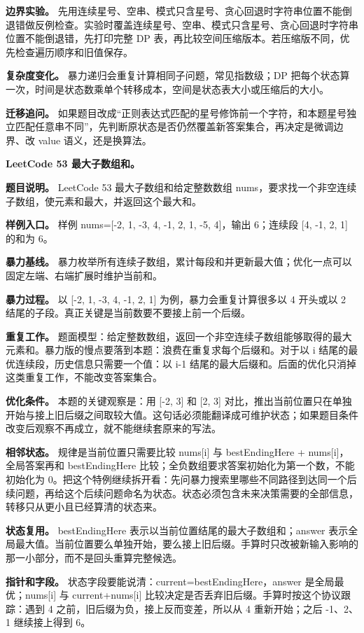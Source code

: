 \textbf{边界实验。} 先用连续星号、空串、模式只含星号、贪心回退时字符串位置不能倒退错做反例检查。实验时覆盖连续星号、空串、模式只含星号、贪心回退时字符串位置不能倒退错，先打印完整 DP 表，再比较空间压缩版本。若压缩版不同，优先检查遍历顺序和旧值保存。

\textbf{复杂度变化。} 暴力递归会重复计算相同子问题，常见指数级；DP 把每个状态算一次，时间是状态数乘单个转移成本，空间是状态表大小或压缩后的大小。

\textbf{迁移追问。} 如果题目改成“正则表达式匹配的星号修饰前一个字符，和本题星号独立匹配任意串不同”，先判断原状态是否仍然覆盖新答案集合，再决定是微调边界、改 value 语义，还是换算法。

\noindent\textbf{LeetCode 53 最大子数组和。}

\textbf{题目说明。} LeetCode 53 最大子数组和给定整数数组 nums，要求找一个非空连续子数组，使元素和最大，并返回这个最大和。

\textbf{样例入口。} 样例 nums=[-2, 1, -3, 4, -1, 2, 1, -5, 4]，输出 6；连续段 [4, -1, 2, 1] 的和为 6。

\textbf{暴力基线。} 暴力枚举所有连续子数组，累计每段和并更新最大值；优化一点可以固定左端、右端扩展时维护当前和。

\textbf{暴力过程。} 以 [-2, 1, -3, 4, -1, 2, 1] 为例，暴力会重复计算很多以 4 开头或以 2 结尾的子段。真正关键是当前数要不要接上前一个后缀。

\textbf{重复工作。} 题面模型：给定整数数组，返回一个非空连续子数组能够取得的最大元素和。暴力版的慢点要落到本题：浪费在重复求每个后缀和。对于以 i 结尾的最优连续段，历史信息只需要一个值：以 i-1 结尾的最大后缀和。后面的优化只消掉这类重复工作，不能改变答案集合。

\textbf{优化条件。} 本题的关键观察是：用 [-2, 3] 和 [2, 3] 对比，推出当前位置只在单独开始与接上旧后缀之间取较大值。这句话必须能翻译成可维护状态；如果题目条件改变后观察不再成立，就不能继续套原来的写法。

\textbf{相邻状态。} 规律是当前位置只需要比较 nums[i] 与 bestEndingHere + nums[i]，全局答案再和 bestEndingHere 比较；全负数组要求答案初始化为第一个数，不能初始化为 0。把这个特例继续拆开看：先问暴力搜索里哪些不同路径到达同一个后续问题，再给这个后续问题命名为状态。状态必须包含未来决策需要的全部信息，转移只从更小且已经算清的状态来。

\textbf{状态复用。} bestEndingHere 表示以当前位置结尾的最大子数组和；answer 表示全局最大值。当前位置要么单独开始，要么接上旧后缀。手算时只改被新输入影响的那一小部分，而不是回头重算完整候选。

\textbf{指针和字段。} 状态字段要能说清：current=bestEndingHere，answer 是全局最优；nums[i] 与 current+nums[i] 比较决定是否丢弃旧后缀。手算时按这个协议跟踪：遇到 4 之前，旧后缀为负，接上反而变差，所以从 4 重新开始；之后 -1、2、1 继续接上得到 6。

